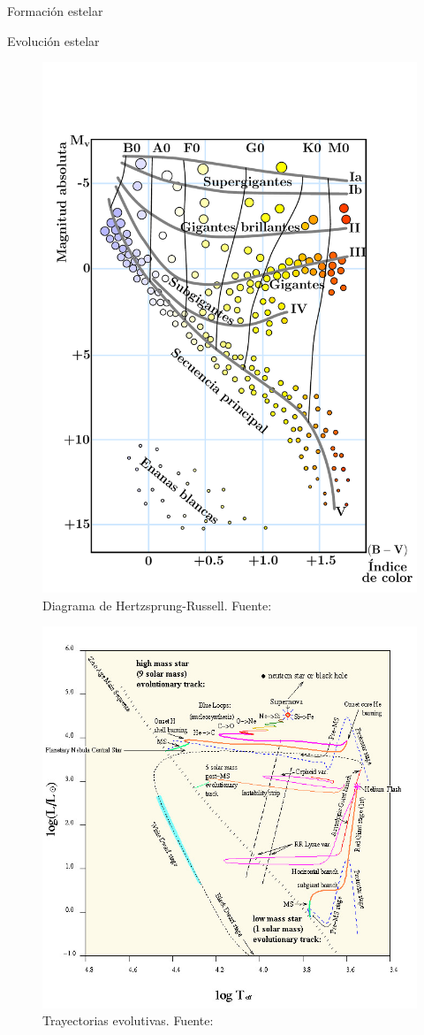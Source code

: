 \documentclass[11pt]{beamer}
\begin{document}
\begin{frame}{Formación estelar}
\begin{figure}
\begin{minipage}{.5\textwidth}
    \end{minipage}
    \end{figure}
\end{frame}


\begin{frame}{Evolución estelar}
\begin{figure}
    \centering
    \includegraphics[width=0.55\linewidth,height=0.6\linewidth]{H-R_diagram.pdf}
    \caption{Diagrama de Hertzsprung-Russell. Fuente:}
\end{figure}
    
\end{frame}

\begin{frame}{}
    \begin{figure}
        \centering
        \includegraphics[width=0.7\linewidth]{evoltracks.jpg}
        \caption{Trayectorias evolutivas. Fuente:}
    \end{figure}
\end{frame}
\end{document}
